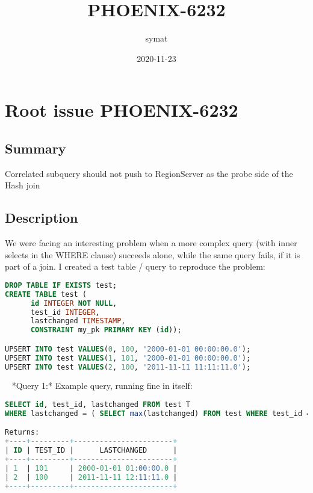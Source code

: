 \documentclass{report}%
\title{PHOENIX{-}6232}%
\author{symat}%
\date{2020{-}11{-}23}%
\begin{document}
%
\normalsize%
\maketitle%
\tableofcontents%
\chapter{Root issue PHOENIX{-}6232}%
\label{chap:RootissuePHOENIX{-}6232}%
\section{Summary}%
\label{sec:Summary}%
Correlated subquery should not push to RegionServer as the probe side of the Hash join

%
\section{Description}%
\label{sec:Description}%
We were facing an interesting problem when a more complex query (with inner selects in the WHERE clause) succeeds alone, while the same query fails, if it is part of a join. I created a test table / query to reproduce the problem:\newline%
\begin{lstlisting}[language=sql]
DROP TABLE IF EXISTS test;
CREATE TABLE test (
      id INTEGER NOT NULL,
      test_id INTEGER,
      lastchanged TIMESTAMP,
      CONSTRAINT my_pk PRIMARY KEY (id));

UPSERT INTO test VALUES(0, 100, '2000-01-01 00:00:00.0');
UPSERT INTO test VALUES(1, 101, '2000-01-01 00:00:00.0');
UPSERT INTO test VALUES(2, 100, '2011-11-11 11:11:11.0');
\end{lstlisting} \ \newline%
\newline%
*Query 1:* Example query, running fine in itself:\newline%
\begin{lstlisting}[language=sql]
SELECT id, test_id, lastchanged FROM test T
WHERE lastchanged = ( SELECT max(lastchanged) FROM test WHERE test_id = T.test_id )

Returns:
+----+---------+-----------------------+
| ID | TEST_ID |      LASTCHANGED      |
+----+---------+-----------------------+
| 1  | 101     | 2000-01-01 01:00:00.0 |
| 2  | 100     | 2011-11-11 12:11:11.0 |
+----+---------+-----------------------+
\end{lstlisting} \ \newline%
\newline%
\end{document}
